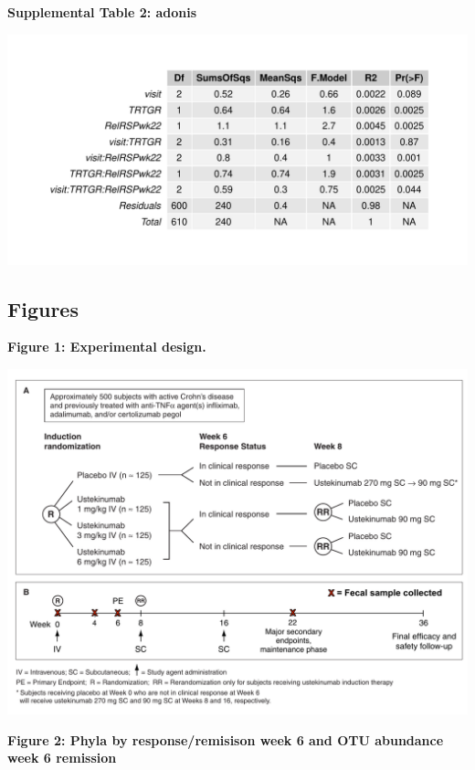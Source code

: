 \documentclass[11pt,]{article}
\begin{document}
\newpage

\textbf{Supplemental Table 2: adonis}

\includegraphics{tables/SF2adonis.pdf}

\newpage

\subsection{Figures}\label{figures}

\textbf{Figure 1: Experimental design.}

\includegraphics{figures/Figure1_expdesign.pdf}

\newpage

\textbf{Figure 2: Phyla by response/remisison week 6 and OTU abundance
week 6 remission}
\end{document}
